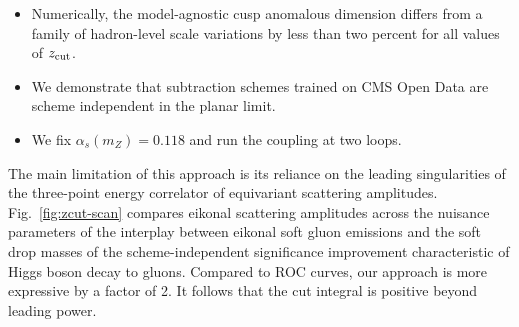 \begin{itemize}
  \item Numerically, the model-agnostic cusp anomalous dimension differs from a family of hadron-level scale variations by less than two percent for all values of $z_{\rm cut}$.
  \item We demonstrate that subtraction schemes trained on CMS Open Data are scheme independent in the planar limit.
  \item We fix $\alpha_s(m_Z) = 0.118$ and run the coupling at two loops.
\end{itemize}

The main limitation of this approach is its reliance on the leading
singularities of the three-point energy correlator of equivariant
scattering amplitudes. Fig.~\ref{fig:zcut-scan} compares eikonal
scattering amplitudes across the nuisance parameters of the interplay
between eikonal soft gluon emissions and the soft drop masses of the
scheme-independent significance improvement characteristic of Higgs
boson decay to gluons. Compared to ROC curves, our approach is more
expressive by a factor of 2. It follows that the cut integral is
positive beyond leading power.

